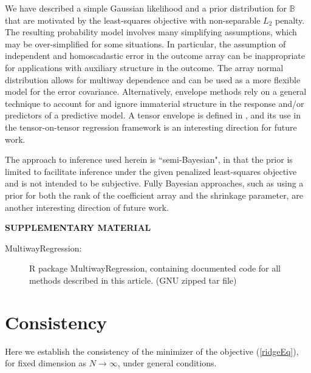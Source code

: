 \documentclass[12pt]{article}
\def\BB{\mathbb{B}}
\begin{document}
We have described a simple Gaussian likelihood and a prior distribution for $\BB$ that are motivated by the least-squares objective with non-separable $L_2$ penalty.  The resulting probability model involves many simplifying assumptions, which may be over-simplified for some situations.  In particular, the assumption of independent and homoscadastic error in the outcome array can be inappropriate for applications with auxiliary structure in the outcome.  The array normal distribution \citep{akdemir2011array,hoff2011separable} allows for multiway dependence and can be used as a more flexible model for the error covariance.  Alternatively, envelope methods \citep{cook2015foundations} rely on a general technique to account for and ignore immaterial structure in the response and/or predictors of a predictive model.  A tensor envelope is defined in \citet{li2016parsimonious}, and its use in the tensor-on-tensor regression framework is an interesting direction for future work. 

The approach to inference used herein is ``semi-Bayesian", in that the prior is limited to facilitate inference under the given penalized least-squares objective and is not intended to be subjective.  Fully Bayesian approaches, such as using a prior for both the rank of the coefficient array and the shrinkage parameter, are another interesting direction of future work.    



\bigskip
\begin{center}
{\large\bf SUPPLEMENTARY MATERIAL}
\end{center}

\begin{description}

\item[MultiwayRegression:] R package MultiwayRegression, containing documented code for all methods described in this article.  (GNU zipped tar file)

\end{description}

\appendix

\section{Consistency}
\label{consistency}

Here we establish the consistency of the minimizer of the objective (\ref{ridgeEq}), for fixed dimension as $N \rightarrow \infty$, under general conditions.  
\end{document}
